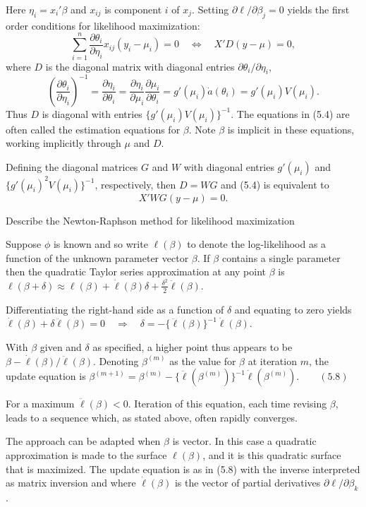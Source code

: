 Here \(\eta_i = x_i' \beta\) and \(x_{ij}\) is component \(i\) of \(x_j\). Setting \(\partial \ell/\partial \beta_j = 0\) yields 
the first order conditions for likelihood maximization:
\[
\sum_{i=1}^{n} \frac{\partial \theta_i}{\partial \eta_i} x_{ij} (y_i - \mu_i) = 0 \quad \Leftrightarrow \quad X'D(y - \mu) = 0,
\]
where \(D\) is the diagonal matrix with diagonal entries \(\partial \theta_i/\partial \eta_i\),
\[
\left(\frac{\partial \theta_i}{\partial \eta_i}\right)^{-1} = \frac{\partial \eta_i}{\partial \theta_i} = \frac{\partial \eta_i}{\partial \mu_i} \frac{\partial \mu_i}{\partial \theta_i} = g'(\mu_i) \dot{a}(\theta_i) = g'(\mu_i) V(\mu_i).
\]
Thus \(D\) is diagonal with entries \(\{g'(\mu_i) V(\mu_i)\}^{-1}\). 
The equations in (5.4) are often called the estimation equations for \(\beta\). 
Note \(\beta\) is implicit in these equations, working implicitly through \(\mu\) and \(D\).

Defining the diagonal matrices \(G\) and \(W\) with diagonal entries \(g'(\mu_i)\) and \(\{g'(\mu_i)^2 V(\mu_i)\}^{-1}\), respectively, 
then \(D = WG\) and (5.4) is equivalent to
\[
X'WG(y - \mu) = 0.
\]


Describe the Newton-Raphson method for likelihood maximization

Suppose \(\phi\) is known and so write \(\ell(\beta)\) to denote the log-likelihood as a function of the unknown parameter vector \(\beta\). 
If \(\beta\) contains a single parameter then the quadratic Taylor series approximation at any point \(\beta\) is 
\(\ell(\beta + \delta) \approx \ell(\beta) + \dot{\ell}(\beta)\delta + \frac{\delta^2}{2} \ddot{\ell}(\beta).\)

Differentiating the right-hand side as a function of \(\delta\) and equating to zero yields 
\(\dot{\ell}(\beta) + \delta \ddot{\ell}(\beta) = 0 \quad \Rightarrow \quad \delta = - \{\ddot{\ell}(\beta)\}^{-1} \dot{\ell}(\beta).\)

With \(\beta\) given and \(\delta\) as specified, a higher point thus appears to be \(\beta - \dot{\ell}(\beta)/\ddot{\ell}(\beta)\). 
Denoting \(\beta^{(m)}\) as the value for \(\beta\) at iteration \(m\), the update equation is
\(\beta^{(m+1)} = \beta^{(m)} - \{\ddot{\ell}(\beta^{(m)})\}^{-1} \dot{\ell}(\beta^{(m)}). \qquad (5.8)\)

For a maximum \(\ddot{\ell}(\beta) < 0\). 
Iteration of this equation, each time revising \(\beta\), leads to a sequence which, as stated above, often rapidly converges.

The approach can be adapted when \(\beta\) is vector. In this case a quadratic approximation is made to the surface \(\ell(\beta)\), 
and it is this quadratic surface that is maximized. The update equation is as in (5.8) with the inverse interpreted as matrix inversion 
and where \(\dot{\ell}(\beta)\) is the vector of partial derivatives \(\partial \ell / \partial \beta_k\). 

